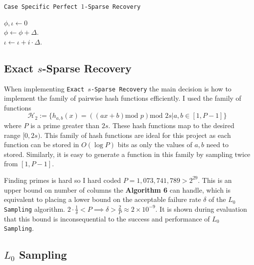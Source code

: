 \documentclass[11pt,twoside,a4paper]{report}
\begin{document}
\begin{algorithm}
	\caption{\texttt{Case Specific Perfect $1$-Sparse Recovery}}
	$\phi,\iota\leftarrow0$\\
	 {
		$\phi\leftarrow\phi+\Delta$.\\
		$\iota\leftarrow\iota+i\cdot\Delta$.
	}
\end{algorithm}

\subsection{Exact $s$-Sparse Recovery}

\par When implementing \texttt{Exact $s$-Sparse Recovery} the main decision is how to implement the family of pairwise hash functions efficiently. I used the family of functions
$$\mathcal{H}_2:=\{h_{a,b}(x)=((ax+b)\text{mod }p)\text{mod }2s|a,b\in[1,P-1]\}$$
where $P$ is a prime greater than $2s$. These hash functions map to the desired range $[0,2s)$. This family of hash functions are ideal for this project as each function can be stored in $O(\log P)$ bits as only the values of $a,b$ need to stored. Similarly, it is easy to generate a function in this family by sampling twice from $[1,P-1]$.

\par Finding primes is hard so I hard coded $P=1,073,741,789>2^{29}$. This is an upper bound on number of columns the \textbf{Algorithm 6} can handle, which is equivalent to placing a lower bound on the acceptable failure rate $\delta$ of the \texttt{$L_0$ Sampling} algorithm. $2\cdot\frac1\delta<P\implies\delta>\frac2P\approx2\times10^{-9}$. It is shown during evaluation that this bound is inconsequential to the success and performance of \texttt{$L_0$ Sampling}.

\subsection{$L_0$ Sampling}
\end{document}
